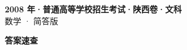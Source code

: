 \documentclass[zihao=-4, a4paper]{ctexart}
\begin{document}
\begin{center}
  {\Large\bfseries 2008 年·普通高等学校招生考试·陕西卷·文科}\\[4pt]
  {\large 数学 · 简答版}
\end{center}
\medskip
{}

\clearpage
{}
\begin{center}{\Large\bfseries 答案速查}\end{center}
\medskip

\end{document}
